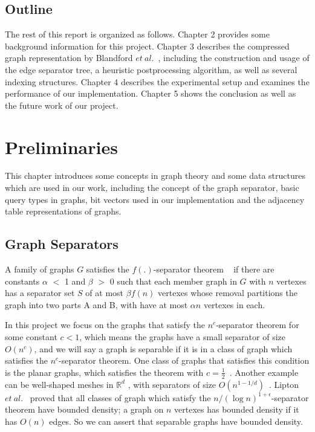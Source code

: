 \documentclass[12pt,glossary]{dalthesis}
\begin{document}
\section{Outline}
The rest of this report is organized as follows. Chapter 2 provides some background information for this project. Chapter 3 describes the compressed graph representation by Blandford $et \ al.$~\cite{compact-representation}, including the construction and usage of the edge separator tree, a heuristic postprocessing algorithm, as well as several indexing structures. Chapter 4 describes the experimental setup and examines the performance of our implementation. Chapter 5 shows the conclusion as well as the future work of our project.


\chapter{Preliminaries}

This chapter introduces some concepts in graph theory and some data structures which are used in our work, including the concept of the graph separator, basic query types in graphs, bit vectors used in our implementation and the adjacency table representations of graphs.

\section{Graph Separators}
A family of graphs $G$ satisfies the $f(.)$-separator theorem ~\cite{separator-theorem} if there are constants $\alpha$ $<$ 1 and $\beta$ $>$ 0 such that each member graph in $G$ with $n$ vertexes has a separator set $S$ of at most $\beta f(n)$ vertexes whose removal partitions the graph into two parts A and B, with have at most $\alpha n$ vertexes in each.

\bigskip
\bigskip

In this project we focus on the graphs that satisfy the $n^{c}$-separator theorem for some constant $c < 1$, which means the graphs have a small separator of size $O(n^{c})$, and we will say a graph is separable if it is in a class of graph which satisfies the $n^{c}$-separator theorem. One class of graphs that satisfies this condition is the planar graphs, which satisfies the theorem with $c = \frac{1}{2}$~\cite{separator-theorem}. Another example can be well-shaped meshes in $\mathbb{R}^{d}$ , with separators of size $O(n^{1-1/d})$~\cite{ separators-sphere-packing}.  Lipton $et \ al$.~\cite{Nested-Dissection} proved that all classes of graph which satisfy the $n/(\log n )^{1+\epsilon}$-separator theorem have bounded density; a graph on $n$ vertexes has bounded density if it has $O(n)$ edges. So we can assert that separable graphs have bounded density.
\end{document}
